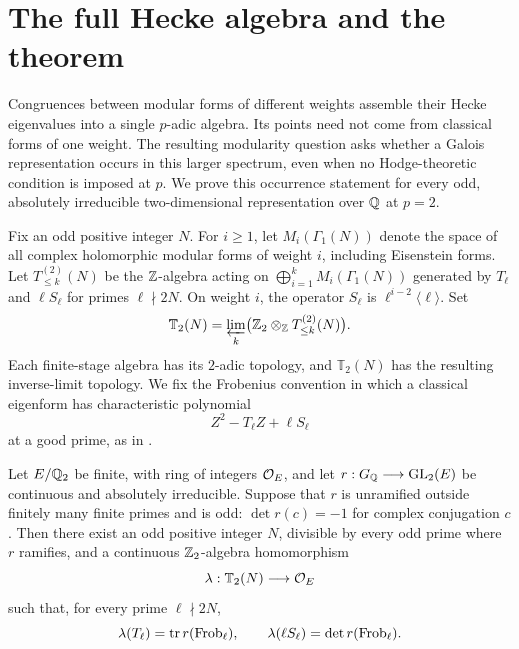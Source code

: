 \section{The full Hecke algebra and the theorem}
\label{sec:introduction}

Congruences between modular forms of different weights assemble their
Hecke eigenvalues into a single $p$-adic algebra. Its points need not
come from classical forms of one weight. The resulting modularity
question asks whether a Galois representation occurs in this larger
spectrum, even when no Hodge-theoretic condition is imposed at $p$.
We prove this occurrence statement for every odd, absolutely
irreducible two-dimensional representation over $\mathbb Q$ at $p=2$.

Fix an odd positive integer $N$. For $i\geq1$, let
$M_i(\Gamma_1(N))$ denote the space of all complex holomorphic modular
forms of weight $i$, including Eisenstein forms. Let
$T_{\leq k}^{(2)}(N)$ be the $\mathbb Z$-algebra acting on
$\bigoplus_{i=1}^{k}M_i(\Gamma_1(N))$
generated by $T_\ell$ and $\ell S_\ell$ for primes $\ell\nmid2N$.
On weight $i$, the operator $S_\ell$ is
$\ell^{i-2}\langle\ell\rangle$. Set
\begin{equation}\label{eq:full-hecke}
 \mathbb T_2(N)=
 \varprojlim_k\bigl(\mathbb Z_2\otimes_{\mathbb Z}T_{\leq k}^{(2)}(N)\bigr).
\end{equation}
Each finite-stage algebra has its $2$-adic topology, and
$\mathbb T_2(N)$ has the resulting inverse-limit topology.
We fix the Frobenius convention in which a classical eigenform has
characteristic polynomial
\begin{equation}\label{eq:frobenius}
 Z^2-T_\ell Z+\ell S_\ell
\end{equation}
at a good prime, as in \cite[Equation~(2.2)]{Dim}.

\begin{theorem}\label{thm:main}
Let $E/\mathbb Q_2$ be finite, with ring of integers $\mathcal O_E$, and let
$r:G_{\mathbb Q}\longrightarrow\operatorname{GL}_2(E)$
be continuous and absolutely irreducible. Suppose that $r$ is
unramified outside finitely many finite primes and is odd:
$\det r(c)=-1$ for complex conjugation $c$.
Then there exist an odd positive integer $N$, divisible by every odd
prime where $r$ ramifies, and a continuous $\mathbb Z_2$-algebra homomorphism
\[
 \lambda:\mathbb T_2(N)\longrightarrow\mathcal O_E
\]
such that, for every prime $\ell\nmid2N$,
\[
 \lambda(T_\ell)=\operatorname{tr} r(\operatorname{Frob}_\ell),\qquad
 \lambda(\ell S_\ell)=\det r(\operatorname{Frob}_\ell).
\]
\end{theorem}

